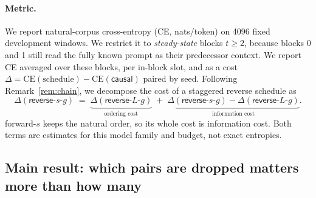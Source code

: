 \documentclass[11pt]{article}
\theoremstyle{definition}
\theoremstyle{remark}
\newcommand{\sch}[1]{\textsf{#1}}
\begin{document}
\paragraph{Metric.}
We report natural-corpus cross-entropy (CE, nats/token) on 4096 fixed development windows.
We restrict it to \emph{steady-state} blocks $t\ge2$, because blocks 0 and 1 still read the fully known prompt as their predecessor context.
We report CE averaged over these blocks, per in-block slot, and as a cost $\Delta=\text{CE}(\text{schedule})-\text{CE}(\sch{causal})$ paired by seed.
Following Remark~\ref{rem:chain}, we decompose the cost of a staggered reverse schedule as
\begin{equation}
  \Delta(\sch{reverse-$s$-$g$}) \;=\; \underbrace{\Delta(\sch{reverse-$L$-$g$})}_{\text{ordering cost}} \;+\; \underbrace{\Delta(\sch{reverse-$s$-$g$})-\Delta(\sch{reverse-$L$-$g$})}_{\text{information cost}} .
  \label{eq:decomp}
\end{equation}
\sch{forward-$s$} keeps the natural order, so its whole cost is information cost.
Both terms are estimates for this model family and budget, not exact entropies.

\subsection{Main result: which pairs are dropped matters more than how many}
\end{document}
